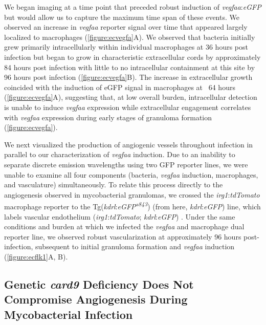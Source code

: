 We began imaging at a time point that preceded robust induction of \textit{vegfaa}:\textit{eGFP} but would allow us to capture the maximum time span of these events. We observed an increase in \textit{vegfaa} reporter signal over time that appeared largely localized to macrophages (\autoref{figure:ecvegfa}A). We observed that bacteria initially grew primarily intracellularly within individual macrophages at 36 hours post infection but began to grow in characteristic extracellular cords by approximately 84 hours post infection with little to no intracellular containment at this site by 96 hours post infection (\autoref{figure:ecvegfa}B). The increase in extracellular growth coincided with the induction of eGFP signal in macrophages at ~64 hours (\autoref{figure:ecvegfa}A), suggesting that, at low overall burden, intracellular detection is unable to induce \textit{vegfaa} expression while extracellular engagement correlates with \textit{vegfaa} expression during early stages of granuloma formation (\autoref{figure:ecvegfa}). 

We next visualized the production of angiogenic vessels throughout infection in parallel to our characterization of \textit{vegfaa} induction. Due to an inability to separate discrete emission wavelengths using two GFP reporter lines, we were unable to examine all four components (bacteria, \textit{vegfaa} induction, macrophages, and vasculature) simultaneously. To relate this process directly to the angiogenesis observed in mycobacterial granulomas, we crossed the \textit{irg1}:\textit{tdTomato} macrophage reporter to the Tg(\textit{kdrl}:\textit{eGFP\textsuperscript{s843}}) (from here, \textit{kdrl}:\textit{eGFP}) line, which labels vascular endothelium (\textit{irg1}:\textit{tdTomato}; \textit{kdrl}:\textit{eGFP}) \citep{Jin2005}. Under the same conditions and burden at which we infected the \textit{vegfaa} and macrophage dual reporter line, we observed robust vascularization at approximately 96 hours post\hyp{}infection, subsequent to initial granuloma formation and \textit{vegfaa} induction (\autoref{figure:ecflk1}A, B). 

\subsection{Genetic \textit{card9} Deficiency Does Not Compromise Angiogenesis During Mycobacterial Infection}

